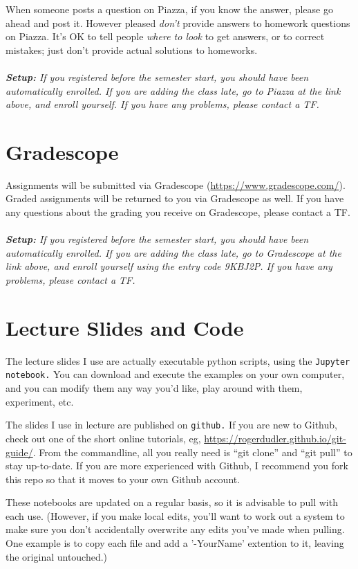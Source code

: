 \documentclass[11pt]{article}
\begin{document}
When someone posts a question on Piazza, if you know the answer, please
go ahead and post it.   However pleased \emph{don't} provide answers to homework
questions on Piazza.   It's OK to tell people \emph{where to look} to
get answers, or to correct mistakes;  just don't provide actual solutions
to homeworks.
\\
~\\\emph{\textbf{Setup:} If you registered before the semester start,
  you should have been automatically enrolled.  If you are adding the
  class late, go to Piazza at the link above, and enroll yourself.   If you have any
  problems, please contact a TF.}

\section*{Gradescope}

Assignments will be submitted via Gradescope
(\url{https://www.gradescope.com/}).    Graded assignments will 
be returned to you via Gradescope as well.   If you have any questions
about the grading you receive on Gradescope, please contact a TF.
\\
~\\\emph{\textbf{Setup:} If you registered before the semester start,
  you should have been automatically enrolled.  If you are adding the
  class late, go to Gradescope at the link above, and enroll yourself
  using the entry code 9KBJ2P.   If you have any
  problems, please contact a TF.}

\section*{Lecture Slides and Code} 

The lecture slides I use are actually executable python scripts, using the
\texttt{Jupyter notebook.}   You can
download and execute the examples on your own computer, and you can
modify them any way you'd like, play around with them, experiment, etc.

The slides I use in lecture are published on \texttt{github.}
  If you are new to Github, check out one of the short online tutorials,
eg, \url{https://rogerdudler.github.io/git-guide/}.  From the
commandline, all you really need is ``git clone'' and ``git pull''  to
stay up-to-date.  If you are more experienced with Github,
I recommend you fork this repo so that it moves to your own Github
account.

These notebooks are updated on a regular basis, so it is
advisable to pull with each use.  (However, if you make local edits,
you'll want to work out a 
system to make sure you don't accidentally overwrite any edits you've
made when pulling. One example is to copy each file and add a
'-YourName' extention to it, leaving the original untouched.)
\end{document}
